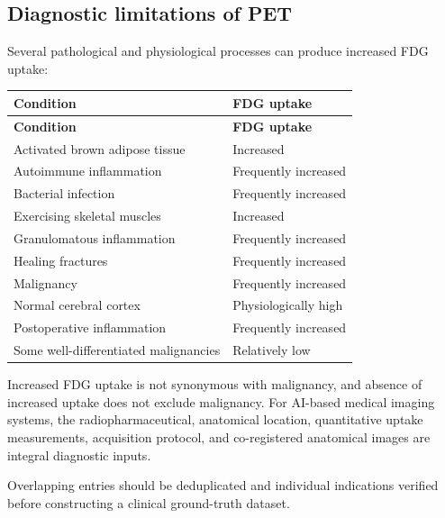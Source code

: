 \subsection{Diagnostic limitations of PET}
Several pathological and physiological processes can produce increased FDG uptake:
\begin{longtable}{@{}p{}p{}@{}}
\toprule
\textbf{Condition} & \textbf{FDG uptake} \\
\midrule
\endfirsthead
\toprule
\textbf{Condition} & \textbf{FDG uptake} \\
\midrule
\endhead
Activated brown adipose tissue & Increased \\
Autoimmune inflammation & Frequently increased \\
Bacterial infection & Frequently increased \\
Exercising skeletal muscles & Increased \\
Granulomatous inflammation & Frequently increased \\
Healing fractures & Frequently increased \\
Malignancy & Frequently increased \\
Normal cerebral cortex & Physiologically high \\
Postoperative inflammation & Frequently increased \\
Some well-differentiated malignancies & Relatively low \\
\bottomrule
\end{longtable}
Increased FDG uptake is not synonymous with malignancy, and absence of increased uptake does not exclude malignancy. For AI-based medical imaging systems, the radiopharmaceutical, anatomical location, quantitative uptake measurements, acquisition protocol, and co-registered anatomical images are integral diagnostic inputs.

 Overlapping entries should be deduplicated and individual indications verified before constructing a clinical ground-truth dataset.
